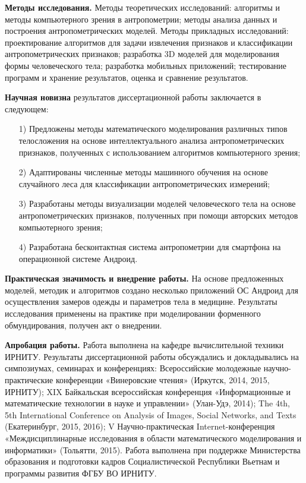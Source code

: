 \textbf{Методы исследования.} Методы теоретических исследований: алгоритмы и методы компьютерного зрения в антропометрии; методы анализа данных и построения антропометрических моделей. Методы прикладных исследований: проектирование алгоритмов для задачи извлечения признаков и классификации антропометрических признаков; разработка 3D моделей для моделирования формы человеческого тела; разработка мобильных приложений; тестирование программ и хранение результатов, оценка и сравнение результатов.

\textbf{Научная новизна} результатов диссертационной работы заключается в следующем:

\begin{enumerate}
	\item[1)] Предложены методы математического моделирования различных типов телосложения на основе интеллектуального анализа антропометрических признаков, полученных с использованием алгоритмов компьютерного зрения;
	\item[2)] Адаптированы численные методы машинного обучения на основе случайного леса для классификации антропометрических измерений;
	\item[3)] Разработаны методы визуализации моделей человеческого тела на основе антропометрических признаков, полученных при помощи авторских методов компьютерного зрения;
	\item[4)] Разработана бесконтактная система антропометрии для смартфона на операционной системе Андроид.
\end{enumerate}

\textbf{Практическая значимость и внедрение работы.} На основе предложенных моделей, методик и алгоритмов создано несколько приложений ОС Андроид для осуществления замеров одежды и параметров тела в медицине. Результаты исследования применены на практике при моделировании форменного обмундирования, получен акт о внедрении.

\textbf{Апробация работы.} Работа выполнена на кафедре вычислительной техники ИРНИТУ. Результаты диссертационной работы обсуждались и докладывались на симпозиумах, семинарах и конференциях: Всероссийские молодежные научно-практические конференции «Винеровские чтения» (Иркутск, 2014, 2015, ИРНИТУ); XIX Байкальская всероссийская конференция «Информационные и математические технологии в науке и управлении» (Улан-Удэ, 2014); The 4th, 5th International Conference on Analysis of Images, Social Networks, and Texts (Екатеринбург, 2015, 2016); V Научно-практическая Internet-конференция «Междисциплинарные исследования в области математического моделирования и информатики» (Тольятти, 2015). Работа выполнена при поддержке Министерства образования и подготовки кадров Социалистической Республики Вьетнам и программы развития ФГБУ ВО ИРНИТУ.

